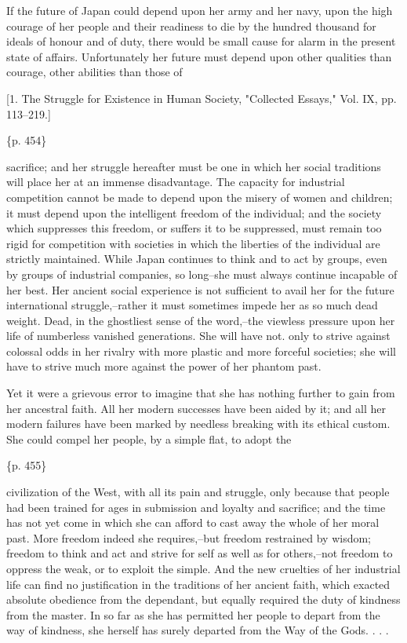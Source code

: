 If the future of Japan could depend upon her army and her navy, upon the high courage of her people and their readiness to die by the hundred thousand for ideals of honour and of duty, there would be small cause for alarm in the present state of affairs. Unfortunately her future must depend upon other qualities than courage, other abilities than those of

[1. The Struggle for Existence in Human Society, "Collected Essays," Vol. IX, pp. 113--219.]

\{p. 454\}

sacrifice; and her struggle hereafter must be one in which her social traditions will place her at an immense disadvantage. The capacity for industrial competition cannot be made to depend upon the misery of women and children; it must depend upon the intelligent freedom of the individual; and the society which suppresses this freedom, or suffers it to be suppressed, must remain too rigid for competition with societies in which the liberties of the individual are strictly maintained. While Japan continues to think and to act by groups, even by groups of industrial companies, so long--she must always continue incapable of her best. Her ancient social experience is not sufficient to avail her for the future international struggle,--rather it must sometimes impede her as so much dead weight. Dead, in the ghostliest sense of the word,--the viewless pressure upon her life of numberless vanished generations. She will have not. only to strive against colossal odds in her rivalry with more plastic and more forceful societies; she will have to strive much more against the power of her phantom past.



Yet it were a grievous error to imagine that she has nothing further to gain from her ancestral faith. All her modern successes have been aided by it; and all her modern failures have been marked by needless breaking with its ethical custom. She could compel her people, by a simple flat, to adopt the

\{p. 455\}

civilization of the West, with all its pain and struggle, only because that people had been trained for ages in submission and loyalty and sacrifice; and the time has not yet come in which she can afford to cast away the whole of her moral past. More freedom indeed she requires,--but freedom restrained by wisdom; freedom to think and act and strive for self as well as for others,--not freedom to oppress the weak, or to exploit the simple. And the new cruelties of her industrial life can find no justification in the traditions of her ancient faith, which exacted absolute obedience from the dependant, but equally required the duty of kindness from the master. In so far as she has permitted her people to depart from the way of kindness, she herself has surely departed from the Way of the Gods. . . .

